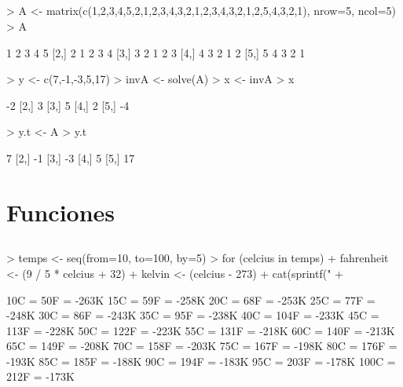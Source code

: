 \documentclass[letterpaper]{report}
\begin{document}
\subsection{}
\begin{Schunk}
\begin{Sinput}
> A <- matrix(c(1,2,3,4,5,2,1,2,3,4,3,2,1,2,3,4,3,2,1,2,5,4,3,2,1), nrow=5, ncol=5)
> A
\end{Sinput}
\begin{Soutput}
     [,1] [,2] [,3] [,4] [,5]
[1,]    1    2    3    4    5
[2,]    2    1    2    3    4
[3,]    3    2    1    2    3
[4,]    4    3    2    1    2
[5,]    5    4    3    2    1
\end{Soutput}
\begin{Sinput}
> y <- c(7,-1,-3,5,17)
> invA <- solve(A)
> x <- invA %*% y
> x
\end{Sinput}
\begin{Soutput}
     [,1]
[1,]   -2
[2,]    3
[3,]    5
[4,]    2
[5,]   -4
\end{Soutput}
\begin{Sinput}
> y.t <- A %*% x
> y.t
\end{Sinput}
\begin{Soutput}
     [,1]
[1,]    7
[2,]   -1
[3,]   -3
[4,]    5
[5,]   17
\end{Soutput}
\end{Schunk}

\section{Funciones}

\subsection{}
\begin{Schunk}
\begin{Sinput}
> temps <- seq(from=10, to=100, by=5)
> for (celcius in temps) {
+     fahrenheit <- (9 / 5 * celcius + 32)
+     kelvin <- (celcius - 273)
+     cat(sprintf("%iC = %iF = %iK\n", celcius, fahrenheit, kelvin))
+ }
\end{Sinput}
\begin{Soutput}
10C = 50F = -263K
15C = 59F = -258K
20C = 68F = -253K
25C = 77F = -248K
30C = 86F = -243K
35C = 95F = -238K
40C = 104F = -233K
45C = 113F = -228K
50C = 122F = -223K
55C = 131F = -218K
60C = 140F = -213K
65C = 149F = -208K
70C = 158F = -203K
75C = 167F = -198K
80C = 176F = -193K
85C = 185F = -188K
90C = 194F = -183K
95C = 203F = -178K
100C = 212F = -173K
\end{Soutput}
\end{Schunk}
\end{document}
